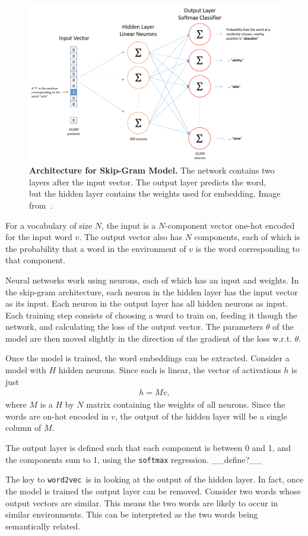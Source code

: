 \documentclass{article} %
\newcommand{\wordtvec}{\texttt{word2vec}}
\begin{document}
\begin{figure}[h]
	\centering
	\includegraphics[width=.5\textwidth]{skip_gram_net_arch}
	\caption{\textbf{Architecture for Skip-Gram Model.} The network contains two layers after the input vector. The output layer predicts the word, but the hidden layer contains the weights used for embedding. Image from~\cite{mccormick}.}
	\label{fig:skipgram}
\end{figure}

For a vocabulary of size $N$, the input is a $N$-component vector one-hot encoded for the input word $v$. The output vector also has $N$ components, each of which is the probability that a word in the environment of $v$ is the word corresponding to that component. 

Neural networks work using neurons, each of which has an input and weights. In the skip-gram architecture, each neuron in the hidden layer has the input vector as its input. Each neuron in the output layer has all hidden neurons as input. Each training step consists of choosing a word to train on, feeding it though the network, and calculating the loss of the output vector. The parameters $\theta$ of the model are then moved slightly in the direction of the gradient of the loss w.r.t. $\theta$.

Once the model is trained, the word embeddings can be extracted. Consider a model with $H$ hidden neurons. Since each is linear, the vector of activations $h$ is just
\begin{align}
h=Mv, \label{eqn:hidden}
\end{align}
where $M$ is a $H$ by $N$ matrix containing the weights of all neurons. Since the words are on-hot encoded in $v$, the output of the hidden layer will be a single column of $M$. 

The output layer is defined such that each component is between 0 and 1, and the components sum to 1, using the \texttt{softmax} regression. \_\_define?\_\_

The key to \wordtvec\ is in looking at the output of the hidden layer. In fact, once the model is trained the output layer can be removed. Consider two words whose output vectors are similar. This means the two words are likely to occur in similar environments. This can be interpreted as the two words being semantically related. 
\end{document}
